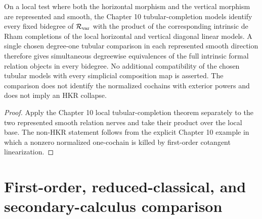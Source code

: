 \begin{theorem}
\label{thm:var-local-tubular}
On a local test where both the horizontal morphism and the vertical morphism are represented and smooth, the Chapter 10 tubular-completion models identify every fixed bidegree of \(\mathcal R_{\mathrm{var}}\) with the product of the corresponding intrinsic de Rham completions of the local horizontal and vertical diagonal linear models. A single chosen degree-one tubular comparison in each represented smooth direction therefore gives simultaneous degreewise equivalences of the full intrinsic formal relation objects in every bidegree. No additional compatibility of the chosen tubular models with every simplicial composition map is asserted. The comparison does not identify the normalized cochains with exterior powers and does not imply an HKR collapse.
\end{theorem}

\begin{proof}
Apply the Chapter 10 local tubular-completion theorem separately to the two represented smooth relation nerves and take their product over the local base. The non-HKR statement follows from the explicit Chapter 10 example in which a nonzero normalized one-cochain is killed by first-order cotangent linearization.
\end{proof}

\section{First-order, reduced-classical, and secondary-calculus comparison}
\label{sec:var-classical-comparison}

